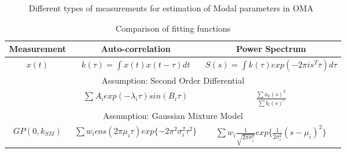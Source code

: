 \begin{figure}[!ht]
  \centering
  \quad
  \quad
  
  \caption{Different types of measurements for estimation of Modal parameters in OMA}
\end{figure}

\renewcommand{\arraystretch}{1.2}
\begin{table}[!h]
    \centering
\begin{tabularx}{0.915\textwidth}{c|c|c}
  \hline
  Measurement & Auto-correlation & Power Spectrum \\
  \hline
  $x(t)$ & $k(\tau) = \int x(t)x(t-\tau)dt$ &  $S(s) = \int k(\tau)exp(-2 \pi i s^{T} \tau )d\tau$\\
  \hline \hline
  \multicolumn{3}{|c|}{Assumption: Second Order Differential}\\
  \hline
   & $ \sum A_{i}exp(-\lambda_{i}\tau)sin(B_{i}\tau)$ & $\frac{\sum a_{k}(s)^{k}}{\sum b_{l}(s)^{l}}$\\
   \hline \hline
   \multicolumn{3}{|c|}{Assumption: Gaussian Mixture Model}\\
   \hline
   $GP(0 , k_{SM})$ 
   & $  \sum w_{i} cos(2\pi\mu_{i}\tau) exp\{-2\pi^{2}\sigma_{i}^{2}\tau^{2}\}$ 
   & $ \sum w_{i}  \frac{1}{\sqrt{2\pi\sigma_{i}^{2}}}exp\{\frac{1}{2\sigma_{i}^{2}}(s-\mu_{i})^{2}\} $\\
   \hline
\end{tabularx}
\caption{Comparison of fitting functions}
  \label{tab:comparisonOfFittingFunctions}
\end{table}

